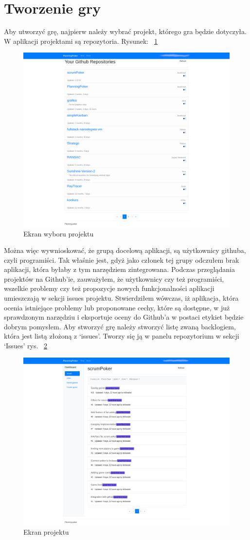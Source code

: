 \section{Tworzenie gry}
Aby utworzyć grę, najpierw należy wybrać projekt, którego gra będzie dotyczyła.
W aplikacji projektami są repozytoria. Rysunek: 
~\ref{rys:projekty}
\begin{figure}[H]
	\centering\includegraphics[width=.7\textwidth]{img/repositories}
	\caption{Ekran wyboru projektu}\label{rys:projekty}%
\end{figure}
Można więc wywnioskować, że grupą docelową aplikacji, są użytkownicy githuba, czyli programiści.
Tak właśnie jest, gdyż jako członek tej grupy odczułem brak aplikacji, która byłaby z tym narzędziem zintegrowana.
Podczas przeglądania projektów na Github'ie, zauważyłem, że użytkownicy czy też programiści,
wszelkie problemy czy też propozycje nowych funkcjonalności aplikacji umieszczają w sekcji issues projektu.
Stwierdziłem wówczas, iż aplikacja, która ocenia istniejące problemy lub proponowane cechy, które są dostępne,
w już sprawdzonym narzędziu i eksportuje oceny do Github'a w postaci etykiet będzie dobrym pomysłem.
Aby stworzyć grę należy stworzyć listę zwaną backlogiem, która jest listą złożoną z `issues'.
Tworzy się ją w panelu repozytorium w sekcji `Issues' rys.
~\ref{rys:issues} 
\begin{figure}[H]
	\centering\includegraphics[width=.7\textwidth]{img/issues}
	\caption{Ekran projektu}\label{rys:issues}%
\end{figure}
